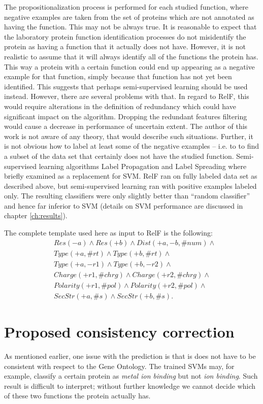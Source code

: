 \documentclass[11pt,twoside,a4paper]{book}
\begin{document}
The propositionalization process is performed for each studied function,
where negative examples are taken from the set of proteins which are not annotated
as having the function.
This may not be always true.
It is reasonable to expect that the laboratory protein
function identification processes do not misidentify the protein as having a function that it actually does not have.
However, it is not realistic to assume that it will always identify all of the functions
the protein has. 
This way a protein with a certain function could end up appearing as a negative example 
for that function, simply because that function has not yet been identified.
This suggests that perhaps semi-supervised learning should be used instead.
However, there are several problems with that.
In regard to RelF, this would require alterations in the definition of redundancy which 
could have significant impact on the algorithm.
Dropping the redundant features filtering would cause a decrease in performance
of uncertain extent. 
The author of this work is not aware of any theory, that would describe such situations.
Further, it is not obvious how to label at least some of the negative examples --
i.e. to to find a subset of the data set that certainly does not have the studied function.
Semi-supervised learning algorithms Label Propagation and Label Spreading \cite{semi}
where briefly examined as a replacement for SVM.
RelF ran on fully labeled data set as described above, but semi-supervised learning
ran with positive examples labeled only.
The resulting classifiers were only slightly better than ``random classifier''
and hence far inferior to SVM (details on SVM performance are discussed in chapter \ref{ch:results}).

The complete template used here as input to RelF is the following:
\begin{align*}
&Res(-a) \land Res(+b) \land Dist(+a,-b, \#num) \land  \\
&Type(+a, \#rt) \land Type(+b, \#rt) \land \\
&Type(+a, -r1) \land Type(+b, -r2) \land \\
&Charge(+r1, \#chrg) \land Charge(+r2, \#chrg) \land \\
&Polarity(+r1, \#pol) \land Polarity(+r2, \#pol) \land \\
&SecStr(+a, \#s) \land SecStr(+b, \#s).
\end{align*}

\section{Proposed consistency correction}
As mentioned earlier, one issue with the prediction is that is does not have to be
consistent with respect to the Gene Ontology.
The trained SVMs may, for example, classify a certain protein
as \emph{metal ion binding}
but not \emph{ion binding}.
Such result is difficult to interpret;
without further knowledge we cannot decide
which of these two functions the protein actually has.
\end{document}

